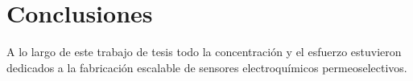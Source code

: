  \newcommand{\NoBiblioConc}[1]{
 \ifthenelse{\equal{#1}{verdadero}}{}{}
 \NoBiblioConc{verdadero}}

 	
 \FormatoCapituloUnaLinea
 
 \chapter{Conclusiones}
 \label{chap:Conclusiones}

 \thispagestyle{empty}
	


 \vfill
 \minitoc
 \newpage

A lo largo de este trabajo de tesis todo la concentración y el esfuerzo estuvieron dedicados a la fabricación escalable de sensores electroquímicos permeoselectivos. 

